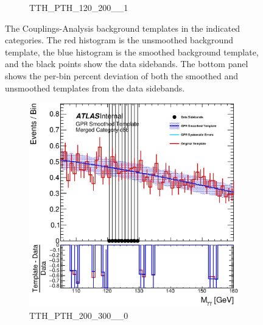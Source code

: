 \begin{figure}
\begin{center}
\begin{subfigure}[T]{0.49\linewidth}
	\caption{TTH\_PTH\_120\_200\_\_1}
\end{subfigure}
\caption{The Couplings-Analysis background templates in the indicated categories. The red histogram is the unsmoothed background template, the blue histogram is the smoothed background template, and the black points show the data sidebands. The bottom panel shows the per-bin percent deviation of both the smoothed and unsmoothed templates from the data sidebands. }
\label{fig:gpr_coupcat_21}
\end{center}
\end{figure}

\begin{figure}
\begin{center}
\begin{subfigure}[T]{0.49\linewidth}
	\centering
	\includegraphics[width=\linewidth]{figures/background/gpr/coupCatTemplates/GPR_Smoothed_Plot_hmgg_c86.eps}
	\caption{TTH\_PTH\_200\_300\_\_0}
\end{subfigure}
\begin{subfigure}[T]{0.49\linewidth}
	\centering

\end{subfigure}
\end{center}
\end{figure}
